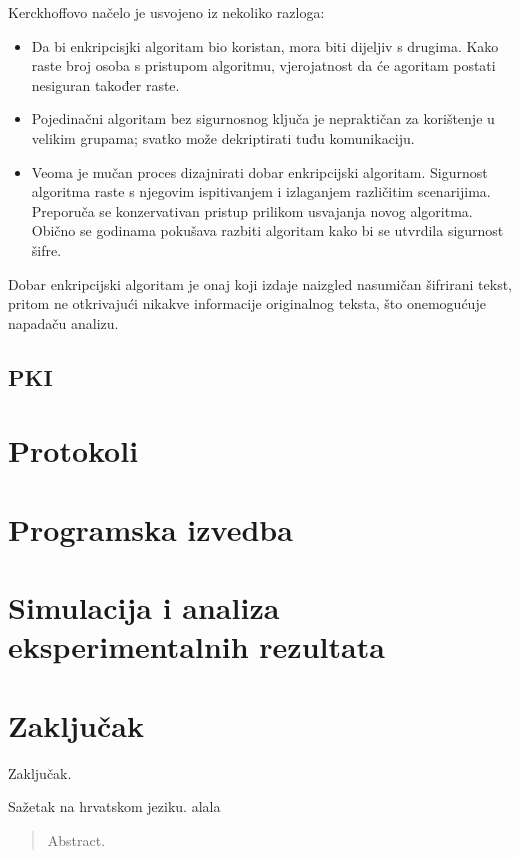 \documentclass[times, utf8, diplomski]{fer}
\begin{document}
Kerckhoffovo načelo je usvojeno iz nekoliko razloga:
\begin{itemize}
\item Da bi enkripcisjki algoritam bio koristan, mora biti dijeljiv s drugima. Kako raste broj osoba s pristupom algoritmu, vjerojatnost da će agoritam postati nesiguran također raste.
\item Pojedinačni algoritam bez sigurnosnog ključa je nepraktičan za korištenje u velikim grupama; svatko može dekriptirati tuđu komunikaciju.
\item Veoma je mučan proces dizajnirati dobar enkripcijski algoritam. Sigurnost algoritma raste s njegovim ispitivanjem i izlaganjem različitim scenarijima. Preporuča se konzervativan pristup prilikom usvajanja novog algoritma. Obično se godinama pokušava razbiti algoritam kako bi se utvrdila sigurnost šifre.
\end{itemize}

Dobar enkripcijski algoritam je onaj koji izdaje naizgled nasumičan šifrirani tekst, pritom ne otkrivajući nikakve informacije originalnog teksta, što onemogućuje napadaču analizu.


\newpage
\section{PKI}


\chapter{Protokoli}

\chapter{Programska izvedba}

\chapter{Simulacija i analiza eksperimentalnih rezultata}

\chapter{Zaključak}
Zaključak.




\begin{sazetak}
Sažetak na hrvatskom jeziku. alala

\end{sazetak}

\begin{abstract}
Abstract.

\end{abstract}
\end{document}
